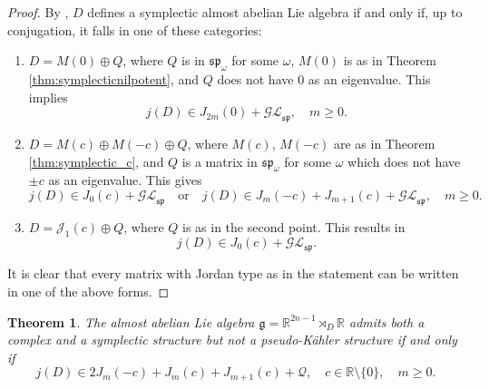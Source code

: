 \documentclass{article}
\newtheorem{theorem}{Theorem}[section]
\theoremstyle{definition}
\newcommand{\R}{\mathbb{R}}
\newcommand{\frg}{\mathfrak{g}}
\newcommand{\lie}[1]{\mathfrak{#1}}
\begin{document}
\begin{proof}
    By \cite[Theorem 5.26]{ArroyoBarberisDiazGodoyHernandez}, $D$ defines a symplectic almost abelian Lie algebra if and only if, up to conjugation, it falls in one of these categories: \begin{enumerate}
        \item $D=M(0)\oplus Q$, where $Q$ is in $\lie{sp}_\omega$ for some $\omega$, $M(0)$ is as in Theorem \ref{thm:symplecticnilpotent}, and $Q$ does not have $0$ as an eigenvalue. This implies $$j(D)\in J_{2m}(0)+\mathcal{GL}_{\lie{sp}}, \quad m\geq0.$$
        \item $D=M(c)\oplus M(-c)\oplus Q$, where $M(c)$, $M(-c)$ are as in Theorem \ref{thm:symplectic_c}, and $Q$ is a matrix in $\lie{sp}_\omega$ for some $\omega$ which does not have $\pm c$ as an eigenvalue. This gives $$j(D)\in J_{0}(c)+\mathcal{GL}_{\lie{sp}}\quad\text{or}\quad j(D)\in J_m(-c)+J_{m+1}(c)+\mathcal{GL}_{\lie{sp}},\quad m\geq0.$$
        \item $D=\mathcal{J}_1(c)\oplus Q$, where $Q$ is as in the second point. This results in $$j(D)\in J_0(c)+\mathcal{GL}_{\lie{sp}}.$$
    \end{enumerate}
    It is clear that every matrix with Jordan type as in the statement can be written in one of the above forms.
\end{proof}

\begin{theorem}\label{thm:notpk}
    The almost abelian Lie algebra $\frg=\R^{2n-1}\rtimes_D\R$ admits both a complex and a symplectic structure but not a pseudo-Kähler structure if and only if $$j(D)\in 2J_m(-c)+J_m(c)+J_{m+1}(c)+\mathcal{Q}, \quad c\in\R\setminus\{0\},\quad m\geq0.$$
\end{theorem}
\end{document}
